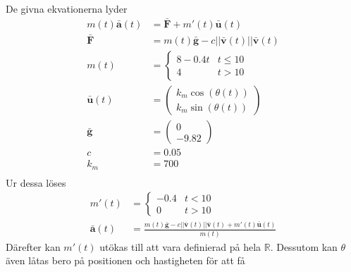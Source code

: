 \documentclass{article}
\newcommand{\bfbar}[1]{\ensuremath{\mathbf{\bar{#1}}}}
\begin{document}
De givna ekvationerna lyder
\[
    \begin{aligned}
        m(t)\bfbar{a}(t) & = \bfbar{F} + m'(t) \bfbar{u}(t)                 \\
        \bfbar{F}        & = m(t) \bfbar{g} - c||\bfbar{v}(t)||\bfbar{v}(t) \\
        m(t)             & = \begin{cases}
                                 8 - 0.4t & t \leq 10 \\
                                 4        & t > 10
                             \end{cases}                           \\
        \bfbar{u}(t)     & = \begin{pmatrix}
                                 k_m \cos(\theta(t)) \\
                                 k_m \sin(\theta(t))
                             \end{pmatrix}                            \\
        \bfbar{g}        & = \begin{pmatrix}
                                 0 \\
                                 -9.82
                             \end{pmatrix}                                 \\
        c                & = 0.05                                           \\
        k_m              & = 700                                            \\
    \end{aligned}
\]
Ur dessa löses
\[
    \begin{aligned}
        m'(t)        & = \begin{cases}
                             -0.4 & t < 10 \\
                             0    & t > 10
                         \end{cases}                                                                    \\
        \bfbar{a}(t) & = \frac{m(t) \bfbar{g} - c||\bfbar{v}(t)||\bfbar{v}(t) + m'(t) \bfbar{u}(t)}{m(t)}
    \end{aligned}
\]
Därefter kan \(m'(t)\) utökas till att vara definierad på hela \(\mathbb{R}\). Dessutom kan \(\theta\) även låtas bero på positionen och hastigheten för att få
\end{document}
